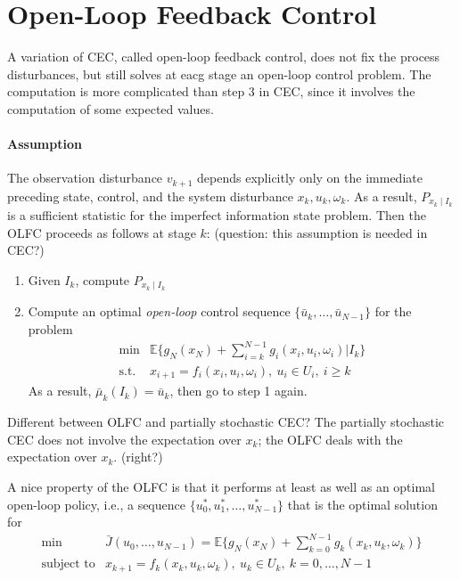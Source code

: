 \section{Open-Loop Feedback Control}
A  variation of CEC, called open-loop feedback control, does not fix the process disturbances, but still solves at eacg stage an open-loop control problem.
The computation is more complicated than step 3 in CEC, since it involves the computation of some expected values.

\paragraph{Assumption}
The observation disturbance $v_{k+1}$ depends explicitly only on the immediate preceding state, control, and the system disturbance $x_k,u_k,\omega_k$.
As a result, $P_{x_k\mid I_k}$ is a sufficient statistic for the imperfect information state problem.
Then the OLFC proceeds as follows at stage $k$: (question: this assumption is needed in CEC?)
\begin{enumerate}
\item
Given $I_k$, compute $P_{x_k\mid I_k}$
\item
Compute an optimal \emph{open-loop} control sequence $\{\bar{u}_k,\dots,\bar{u}_{N-1}\}$ for the problem
\[
\begin{array}{ll}
\min&\mathbb{E}\Bigg\{
g_N(x_N)+\sum_{i=k}^{N-1}g_i(x_i,u_i,\omega_i)\Bigg|I_k
\Bigg\}\\
\text{s.t.}&x_{i+1}=f_i(x_i,u_i,\omega_i),\ u_i\in U_i,\ i\ge k
\end{array}
\]
As a result, $\bar{\mu}_k(I_k) = \bar{u}_k$, then go to step 1 again.
\end{enumerate}
\begin{remark}
Different between OLFC and partially stochastic CEC?
The partially stochastic CEC does not involve the expectation over $x_k$; the OLFC deals with the expectation over $x_k$. (right?)
\end{remark}

A nice property of the OLFC is that it performs at least as well as an optimal open-loop policy, i.e., a sequence $\{u_0^*,u_1^*,\dots,u_{N-1}^*\}$ that is the optimal solution for 
\[
\begin{array}{ll}
\min&\bar{J}(u_0,\dots,u_{N-1})=\mathbb{E}\Bigg\{
g_N(x_N)+\sum_{k=0}^{N-1}g_k(x_k,u_k,\omega_k)
\Bigg\}\\
\text{subject to}&x_{k+1}=f_k(x_k,u_k,\omega_k),\ u_k\in U_k,\ k=0,\dots,N-1
\end{array}
\]

